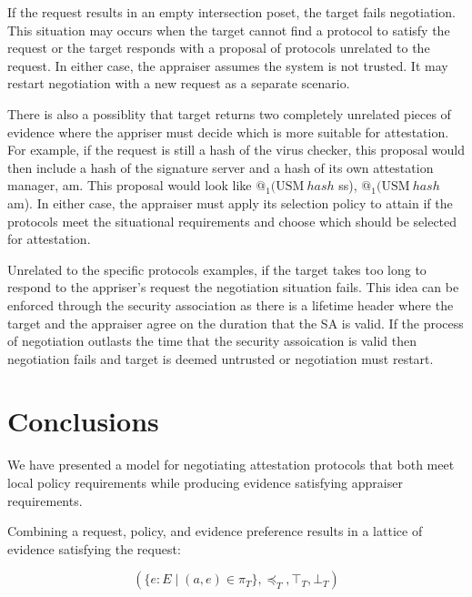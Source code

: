 \documentclass[sigconf,authordraft]{acmart}
\begin{document}
If the request results in an empty intersection poset, the target
fails negotiation. This situation may occurs when the target cannot
find a protocol to satisfy the request or the target responds with a
proposal of protocols unrelated to the request. In either case, the
appraiser assumes the system is not trusted. It may restart
negotiation with a new request as a separate scenario.

There is also a possiblity that target returns two completely
unrelated pieces of evidence where the appriser must decide which is
more suitable for attestation. For example, if the request is still a
hash of the virus checker, this proposal would then include a hash of
the signature server and a hash of its own attestation manager,
am. This proposal would look like {$@_1 (\text{USM}\: hash$ ss),
  $@_1 (\text{USM}\: hash$ am)}. In either case, the appraiser must
apply its selection policy to attain if the protocols meet the
situational requirements and choose which should be selected for
attestation.


Unrelated to the specific protocols examples, if the target takes too
long to respond to the appriser's request the negotiation situation
fails. This idea can be enforced through the security association as
there is a lifetime header where the target and the appraiser agree on
the duration that the SA is valid. If the process of negotiation
outlasts the time that the security assoication is valid then
negotiation fails and target is deemed untrusted or negotiation must
restart.

\printglossary \glsaddallunused

\section{Conclusions}

We have presented a model for negotiating attestation protocols that
both meet local policy requirements while producing evidence
satisfying appraiser requirements.

Combining a request, policy, and evidence preference results in
a lattice of evidence satisfying the request:

\[(\{e:E\mid (a,e)\in\pi_T\},\preceq_T,\top_T,\bot_T)\]
\end{document}
